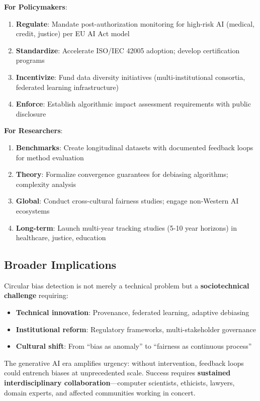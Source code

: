 \documentclass[11pt,a4paper]{article}
\begin{document}
\textbf{For Policymakers}:
\begin{enumerate}
    \item \textbf{Regulate}: Mandate post-authorization monitoring for high-risk AI (medical, credit, justice) per EU AI Act model  
    \item \textbf{Standardize}: Accelerate ISO/IEC 42005 adoption; develop certification programs  
    \item \textbf{Incentivize}: Fund data diversity initiatives (multi-institutional consortia, federated learning infrastructure)  
    \item \textbf{Enforce}: Establish algorithmic impact assessment requirements with public disclosure
\end{enumerate}

\textbf{For Researchers}:
\begin{enumerate}
    \item \textbf{Benchmarks}: Create longitudinal datasets with documented feedback loops for method evaluation  
    \item \textbf{Theory}: Formalize convergence guarantees for debiasing algorithms; complexity analysis  
    \item \textbf{Global}: Conduct cross-cultural fairness studies; engage non-Western AI ecosystems  
    \item \textbf{Long-term}: Launch multi-year tracking studies (5-10 year horizons) in healthcare, justice, education
\end{enumerate}

\subsection{Broader Implications}

Circular bias detection is not merely a technical problem but a \textbf{sociotechnical challenge} requiring:
\begin{itemize}
    \item \textbf{Technical innovation}: Provenance, federated learning, adaptive debiasing  
    \item \textbf{Institutional reform}: Regulatory frameworks, multi-stakeholder governance  
    \item \textbf{Cultural shift}: From ``bias as anomaly'' to ``fairness as continuous process''
\end{itemize}

The generative AI era amplifies urgency: without intervention, feedback loops could entrench biases at unprecedented scale. Success requires \textbf{sustained interdisciplinary collaboration}—computer scientists, ethicists, lawyers, domain experts, and affected communities working in concert.
\end{document}
